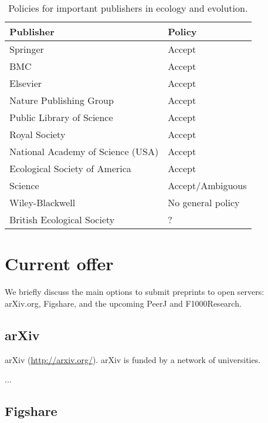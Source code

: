 \documentclass[letterpaper,twocolumn,superscriptaddress,showkeys]{revtex4}
\begin{document}
\begin{table*}
    \centering
    \begin{tabular}{|ll|}
    \hline
    Publisher                                   & Policy \\
    \hline
    Springer                            	& Accept \\
    BMC                                 	& Accept \\
    Elsevier                            	& Accept \\
    Nature Publishing Group             	& Accept \\
    Public Library of Science           	& Accept \\
    Royal Society                       	& Accept \\
    National Academy of Science (USA)           & Accept \\
    Ecological Society of America       	& Accept \\ %
    Science                             	& Accept/Ambiguous \\
    Wiley-Blackwell                       	& No general policy \\ %
    British Ecological Society                  & ? \\ %
    \hline
    \end{tabular}
    \caption{Policies for important publishers in ecology and evolution.}
    \label{table:policies}
\end{table*}

\section{Current offer}

We briefly discuss the main options to submit preprints to open servers:
arXiv.org, Figshare, and the upcoming PeerJ and F1000Research.

\subsection{arXiv}

arXiv (\href{http://arxiv.org/}{http://arxiv.org/}).
arXiv is funded by a network of universities.

...


\subsection{Figshare}
\end{document}
